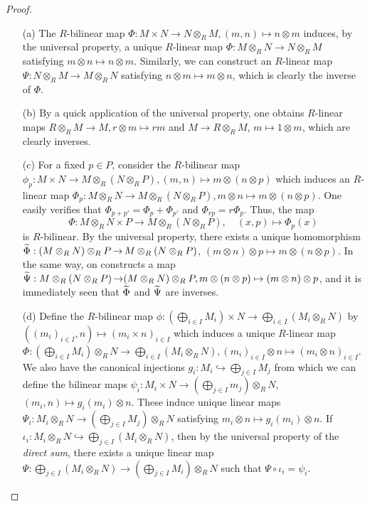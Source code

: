 \documentclass[11pt]{book}
\theoremstyle{definition}   \newtheorem{defn}[counter]{Definition} %
\DeclareMathOperator{\ra}{\rightarrow}   \DeclareMathOperator{\Poly}{\mathbf{P}}   \DeclareMathOperator{\spn}{\textnormal{span}}   \DeclareMathOperator{\aut}{\textnormal{Aut}}
\numberwithin{counter}{chapter}
\begin{document}
\begin{proof}\ 
\begin{enumerate}
\item[(a)] The $R$-bilinear map $\Phi : M \times N \ra N \otimes_R M, (m,n) \mapsto n \otimes m$ induces, by the universal property, a unique $R$-linear map $\Phi : M \otimes_R N \ra N \otimes_R M$ satisfying $m \otimes n \mapsto n \otimes m$. Similarly, we can construct an $R$-linear map $\Psi : N \otimes_R M \ra M \otimes_R N$ satisfying $n \otimes m \mapsto m \otimes n$, which is clearly the inverse of $\Phi$. 

\item[(b)] By a quick application of the universal property, one obtains $R$-linear maps $R \otimes_R M \ra M, r \otimes m \mapsto rm$ and $M \ra R \otimes_R M$, $m \mapsto 1 \otimes m$, which are clearly inverses. 

\item[(c)] For a fixed $p \in P$, consider the $R$-bilinear map $\phi_p : M \times N \ra M \otimes_R (N \otimes_R P), (m,n) \mapsto m \otimes (n \otimes p)$ which induces an $R$-linear map $\Phi_p : M \otimes_R N \ra M \otimes_R (N \otimes_R P), m \otimes n \mapsto m \otimes (n \otimes p)$. One easily verifies that $\Phi_{p+p'} = \Phi_p + \Phi_{p'}$ and $\Phi_{rp} = r \Phi_p$. Thus, the map
	\[\Phi : M \otimes_R N \times P \ra M \otimes_R (N \otimes_R P), \quad (x,p) \mapsto \Phi_p(x) \]
is $R$-bilinear. By the universal property, there exists a unique homomorphism $\wt{\Phi} : (M \otimes_R N) \otimes_R P \ra M \otimes_R (N \otimes_R P)$, $(m \otimes n) \otimes p \mapsto m \otimes (n \otimes p)$. In the same way, on constructs a map $\wt{\Psi} : M \otimes_R (N \otimes_R P) \ra (M \otimes_R N) \otimes_R P, m \otimes (n \otimes p) \mapsto (m \otimes n) \otimes p$, and it is immediately seen that $\widetilde{\Phi}$ and $\widetilde{\Psi}$ are inverses. 

\item[(d)] Define the $R$-bilinear map $\phi : \left(\bigoplus_{i \in I} M_i \right) \times N \ra \bigoplus_{i \in I} \left( M_i \otimes_R N \right)$ by $((m_i)_{i \in I},n) \mapsto (m_i \times n)_{i \in I}$ which induces a unique $R$-linear map $\Phi : \left(\bigoplus_{i \in I} M_i \right) \otimes_R N \ra \bigoplus_{i \in I} \left(M_i \otimes_R N\right), (m_i)_{i \in I} \otimes n \mapsto (m_i \otimes n)_{i \in I}$. \\

We also have the canonical injections $g_i : M_i \hookrightarrow \bigoplus_{j \in I} M_j$ from which we can define the bilinear maps $\psi_i : M_i \times N \ra \left(\bigoplus_{j \in I} m_j \right) \otimes_R N$, $(m_i,n) \mapsto g_i(m_i) \otimes n$. These induce unique linear maps $\Psi_i : M_i \otimes_R N \ra \left( \bigoplus_{j \in I} M_j \right) \otimes_R N$ satisfying $m_i \otimes n \mapsto g_i(m_i) \otimes n$. If $\iota_i : M_i \otimes_R N \hookrightarrow \bigoplus_{j \in I} \left(M_i \otimes_R N \right)$, then by the universal property of the \emph{direct sum}, there exists a unique linear map $\Psi : \bigoplus_{j \in I} \left(M_i \otimes_R N\right) \ra \left(\bigoplus_{j \in I} M_i\right) \otimes_R N$ such that $\Psi \circ \iota_i = \psi_i$. 


\end{enumerate}
\end{proof}
\end{document}

